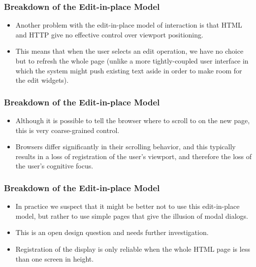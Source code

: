 \documentclass{beamer}
\begin{document}
\begin{frame}
\frametitle{Breakdown of the Edit-in-place Model}

\begin{itemize}
\item Another problem with the edit-in-place model of interaction is that HTML and HTTP give no effective control over viewport positioning.
\item This means that when the user selects an edit operation, we have no choice but to refresh the whole page (unlike a more tightly-coupled user interface in which the system might push existing text aside in order to make room for the edit widgets).
\end{itemize}

\end{frame}

\begin{frame}
\frametitle{Breakdown of the Edit-in-place Model}

\begin{itemize}
\item Although it is possible to tell the browser where to scroll to on the new page, this is very coarse-grained control.
\item Browsers differ significantly in their scrolling behavior, and this typically results in a loss of registration of the user's viewport, and therefore the loss of the user's cognitive focus.
\end{itemize}

\end{frame}

\begin{frame}
\frametitle{Breakdown of the Edit-in-place Model}

\begin{itemize}
\item In practice we suspect that it might be better not to use this edit-in-place model, but rather to use simple pages that give the illusion of modal dialogs.
\item This is an open design question and needs further investigation.
\item Registration of the display is only reliable when the whole HTML page is less than one screen in height.
\end{itemize}

\end{frame}
\end{document}
